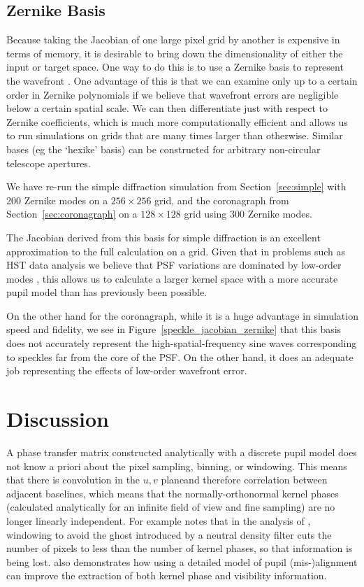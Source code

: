 \documentclass[modern]{aastex63}
\begin{document}
\subsection{Zernike Basis}
\label{zernike}

Because taking the Jacobian of one large pixel grid by another is expensive in terms of memory, it is desirable to bring down the dimensionality of either the input or target space. One way to do this is to use a Zernike basis to represent the wavefront \citep{zernike34}. One advantage of this is that we can examine only up to a certain order in Zernike polynomials if we believe that wavefront errors are negligible below a certain spatial scale. We can then differentiate just with respect to Zernike coefficients, which is much more computationally efficient and allows us to run simulations on grids that are many times larger than otherwise. Similar bases (eg the `hexike' basis) can be constructed for arbitrary non-circular telescope apertures.

We have re-run the simple diffraction simulation from Section~\ref{sec:simple} with 200 Zernike modes on a $256\times256$ grid, and the coronagraph from Section~\ref{sec:coronagraph} on a $128\times128$ grid using 300 Zernike modes. 

The Jacobian derived from this basis for simple diffraction is an excellent approximation to the full calculation on a grid. Given that in problems such as HST data analysis we believe that PSF variations are dominated by low-order modes \citep{pope13}, this allows us to calculate a larger kernel space with a more accurate pupil model than has previously been possible. 

On the other hand for the coronagraph, while it is a huge advantage in simulation speed and fidelity, we see in Figure~\ref{speckle_jacobian_zernike} that this basis does not accurately represent the high-spatial-frequency sine waves corresponding to speckles far from the core of the PSF. On the other hand, it does an adequate job representing the effects of low-order wavefront error. 

\section{Discussion}
\label{sec:discussion}

A phase transfer matrix constructed analytically with a discrete pupil model does not know a priori about the pixel sampling, binning, or windowing. This means that there is convolution in the $u,v$ planeand therefore correlation between adjacent baselines, which means that the normally-orthonormal kernel phases (calculated analytically for an infinite field of view and fine sampling) are no longer linearly independent. For example \citet{martinache20} notes that in the analysis of \citet{palomar}, windowing to avoid the ghost introduced by a neutral density filter cuts the number of pixels to less than the number of kernel phases, so that information is being lost. \citet{martinache20} also demonstrates how using a detailed model of pupil (mis-)alignment can improve the extraction of both kernel phase and visibility information.
\end{document}
